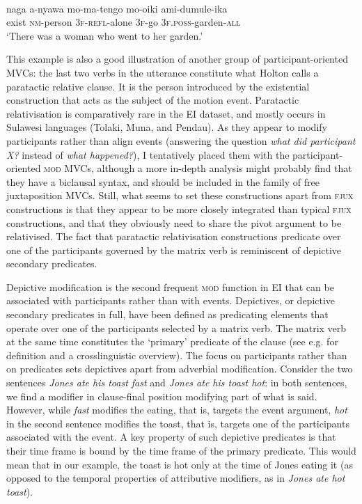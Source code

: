 \ea \label{Tobelo_29}
\\
\gll naga a-nyawa mo-ma-tengo mo-oiki ami-dumule-ika \\
exist \textsc{nm}-person 3\textsc{f}-\textsc{refl}-alone 3\textsc{f}-go 3\textsc{f}.\textsc{poss}-garden-\textsc{all} \\
\glft `There was a woman who went to her garden.'\\ 
\z

This example is also a good illustration of another group of participant-oriented MVCs: the last two verbs in the utterance constitute what Holton calls a paratactic relative clause. It is the person introduced by the existential construction that acts as the subject of the motion event. Paratactic relativisation is comparatively rare in the EI dataset, and mostly occurs in Sulawesi languages (Tolaki, Muna, and Pendau). As they appear to modify participants rather than align events (answering the question \textit{what did participant X?} instead of \textit{what happened?}), I tentatively placed them with the participant-oriented \textsc{mod} MVCs, although a more in-depth analysis might probably find that they have a biclausal syntax, and should be included in the family of free juxtaposition MVCs. Still, what seems to set these constructions apart from \textsc{fjux} constructions is that they appear to be more closely integrated than typical \textsc{fjux} constructions, and that they obviously need to share the pivot argument to be relativised. The fact that paratactic relativisation constructions predicate over one of the participants governed by the matrix verb is reminiscent of depictive secondary predicates.

Depictive modification is the second frequent \textsc{mod} function in EI that can be associated with participants rather than with events. Depictives, or depictive secondary predicates in full, have been defined as predicating elements that operate over one of the participants selected by a matrix verb. The matrix verb at the same time constitutes the `primary' predicate of the clause (see e.g. \citealt{schultze2004depictive} for definition and a crosslinguistic overview). The focus on participants rather than on predicates sets depictives apart from adverbial modification. Consider the two sentences \textit{Jones ate his toast fast} and \textit{Jones ate his toast hot}: in both sentences, we find a modifier in clause-final position modifying part of what is said. However, while \textit{fast} modifies the eating, that is, targets the event argument, \textit{hot} in the second sentence modifies the toast, that is, targets one of the participants associated with the event. A key property of such depictive predicates is that their time frame is bound by the time frame of the primary predicate. This would mean that in our example, the toast is hot only at the time of Jones eating it (as opposed to the temporal properties of attributive modifiers, as in \textit{Jones ate hot toast}).

